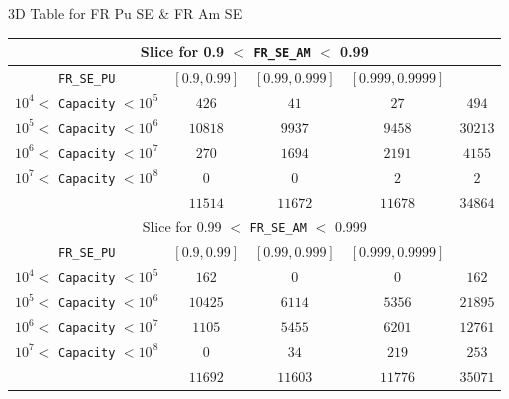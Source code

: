 \documentclass[pdf, autumn, slideColor, nocolorBG]{prosper}
\begin{document}
\begin{slide}{3D Table for FR Pu SE \& FR Am SE}
\begin{center}
\tiny
\begin{tabular}{|c||c|c|c||c|}
\hline
\multicolumn{5}{|c|}{Slice for 0.9 $<$ \texttt{FR\_SE\_AM} $<$ 0.99}\\
\hline
\texttt{FR\_SE\_PU} & $[0.9, 0.99]$ & $[0.99, 0.999]$& $[0.999, 0.9999]$&\\
\hline
$10^4 <$ \texttt{Capacity} $< 10^5$&$426$&$41$&$27$&$494$\\
\hline
$10^5 <$ \texttt{Capacity} $< 10^6$&$10818$&$9937$&$9458$&$30213$\\
\hline
$10^6 <$ \texttt{Capacity} $< 10^7$&$270$&$1694$&$2191$&$4155$\\
\hline
$10^7 <$ \texttt{Capacity} $< 10^8$&$0$&$0$&$2$&$2$\\
\hline
&$11514$&$11672$&$11678$&$34864$\\
\hline
\hline
\multicolumn{5}{|c|}{Slice for 0.99 $<$ \texttt{FR\_SE\_AM} $<$ 0.999}\\
\hline
\texttt{FR\_SE\_PU} & $[0.9, 0.99]$ & $[0.99, 0.999]$& $[0.999, 0.9999]$&\\
\hline
$10^4 <$ \texttt{Capacity} $< 10^5$&$162$&$0$&$0$&$162$\\
\hline
$10^5 <$ \texttt{Capacity} $< 10^6$&$10425$&$6114$&$5356$&$21895$\\
\hline
$10^6 <$ \texttt{Capacity} $< 10^7$&$1105$&$5455$&$6201$&$12761$\\
\hline
$10^7 <$ \texttt{Capacity} $< 10^8$&$0$&$34$&$219$&$253$\\
\hline
&$11692$&$11603$&$11776$&$35071$\\
\hline
\end{tabular}
\end{center}
\end{slide}
\end{document}

